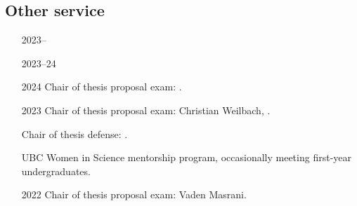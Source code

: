 \documentclass[10pt]{article}
\begin{document}
\subsection{Other service} %

\begin{itemize}[leftmargin=5em]
  \item[2023--] 
  \item[2023--24] 
  \item[2024] Chair of thesis proposal exam: .
  \item[2023] Chair of thesis proposal exam: Christian Weilbach, .
  \item[] Chair of thesis defense: .
  \item[] UBC Women in Science mentorship program, occasionally meeting first-year undergraduates.
  \item[2022] Chair of thesis proposal exam: Vaden Masrani.
\end{itemize}





\end{document}
